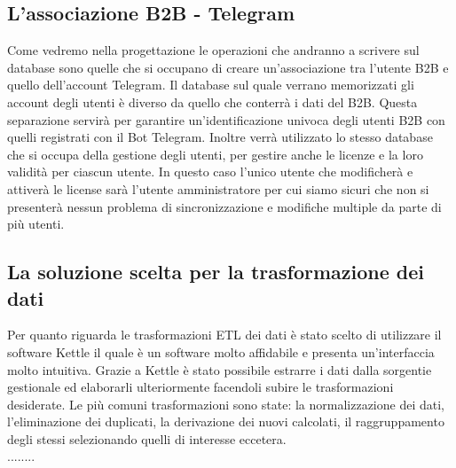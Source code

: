 \subsection{L'associazione B2B - Telegram}
Come vedremo nella progettazione le operazioni che andranno a scrivere sul database sono quelle che si occupano di creare un'associazione tra l'utente B2B e quello dell'account Telegram. Il database sul quale verrano memorizzati gli account degli utenti è diverso da quello che conterrà i dati del B2B. Questa separazione servirà per garantire un'identificazione univoca degli utenti B2B con quelli registrati con il Bot Telegram. Inoltre verrà utilizzato lo stesso database che si occupa della gestione degli utenti, per gestire anche le licenze e la loro validità per ciascun utente. In questo caso l'unico utente che modificherà e attiverà le license sarà l'utente amministratore per cui siamo sicuri che non si presenterà nessun problema di sincronizzazione e modifiche multiple da parte di più utenti. 

\subsection{La  soluzione scelta per la trasformazione dei dati}

Per quanto riguarda le trasformazioni ETL dei dati è stato scelto di utilizzare il software Kettle il quale è un software molto affidabile e presenta un'interfaccia molto intuitiva. Grazie a Kettle è stato possibile estrarre i dati dalla sorgentie gestionale ed elaborarli ulteriormente facendoli subire le trasformazioni desiderate. Le più comuni trasformazioni sono state: la normalizzazione dei dati, l'eliminazione dei duplicati, la derivazione dei nuovi calcolati, il raggruppamento degli stessi selezionando quelli di interesse eccetera. \\

........































